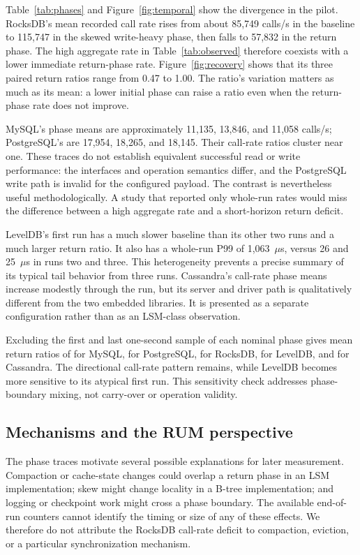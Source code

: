 \documentclass[10pt]{article}
\begin{document}
Table~\ref{tab:phases} and Figure~\ref{fig:temporal} show the divergence in the pilot. RocksDB's mean recorded call rate rises from about 85,749 calls/s in the baseline to 115,747 in the skewed write-heavy phase, then falls to 57,832 in the return phase. The high aggregate rate in Table~\ref{tab:observed} therefore coexists with a lower immediate return-phase rate. Figure~\ref{fig:recovery} shows that its three paired return ratios range from 0.47 to 1.00. The ratio's variation matters as much as its mean: a lower initial phase can raise a ratio even when the return-phase rate does not improve.

MySQL's phase means are approximately 11,135, 13,846, and 11,058 calls/s; PostgreSQL's are 17,954, 18,265, and 18,145. Their call-rate ratios cluster near one. These traces do not establish equivalent successful read or write performance: the interfaces and operation semantics differ, and the PostgreSQL write path is invalid for the configured payload. The contrast is nevertheless useful methodologically. A study that reported only whole-run rates would miss the difference between a high aggregate rate and a short-horizon return deficit.

LevelDB's first run has a much slower baseline than its other two runs and a much larger return ratio. It also has a whole-run P99 of 1,063~$\mu$s, versus 26 and 25~$\mu$s in runs two and three. This heterogeneity prevents a precise summary of its typical tail behavior from three runs. Cassandra's call-rate phase means increase modestly through the run, but its server and driver path is qualitatively different from the two embedded libraries. It is presented as a separate configuration rather than as an LSM-class observation.

Excluding the first and last one-second sample of each nominal phase gives mean return ratios of \MySQLInteriorRecovery{} for MySQL, \PostgreSQLInteriorRecovery{} for PostgreSQL, \RocksDBInteriorRecovery{} for RocksDB, \LevelDBInteriorRecovery{} for LevelDB, and \CassandraInteriorRecovery{} for Cassandra. The directional call-rate pattern remains, while LevelDB becomes more sensitive to its atypical first run. This sensitivity check addresses phase-boundary mixing, not carry-over or operation validity.

\subsection{Mechanisms and the RUM perspective}
The phase traces motivate several possible explanations for later measurement. Compaction or cache-state changes could overlap a return phase in an LSM implementation; skew might change locality in a B-tree implementation; and logging or checkpoint work might cross a phase boundary. The available end-of-run counters cannot identify the timing or size of any of these effects. We therefore do not attribute the RocksDB call-rate deficit to compaction, eviction, or a particular synchronization mechanism.
\end{document}
